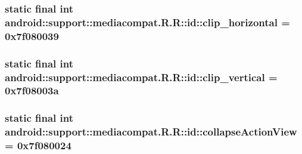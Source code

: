 \hypertarget{classandroid_1_1support_1_1mediacompat_1_1_r_1_1id_8a88b6998b33be994349768c86404646}{
\subsubsection[{clip\_\-horizontal}]{\setlength{\rightskip}{0pt plus 5cm}static final int android::support::mediacompat.R.R::id::clip\_\-horizontal = 0x7f080039}}
\label{classandroid_1_1support_1_1mediacompat_1_1_r_1_1id_8a88b6998b33be994349768c86404646}


\hypertarget{classandroid_1_1support_1_1mediacompat_1_1_r_1_1id_cb8a392ce9a165f12bfd2618fd0c3b25}{
\subsubsection[{clip\_\-vertical}]{\setlength{\rightskip}{0pt plus 5cm}static final int android::support::mediacompat.R.R::id::clip\_\-vertical = 0x7f08003a}}
\label{classandroid_1_1support_1_1mediacompat_1_1_r_1_1id_cb8a392ce9a165f12bfd2618fd0c3b25}


\hypertarget{classandroid_1_1support_1_1mediacompat_1_1_r_1_1id_0cc0468e30aeda11cc46b3cb9a63eb8e}{
\subsubsection[{collapseActionView}]{\setlength{\rightskip}{0pt plus 5cm}static final int android::support::mediacompat.R.R::id::collapseActionView = 0x7f080024}}
\label{classandroid_1_1support_1_1mediacompat_1_1_r_1_1id_0cc0468e30aeda11cc46b3cb9a63eb8e}


